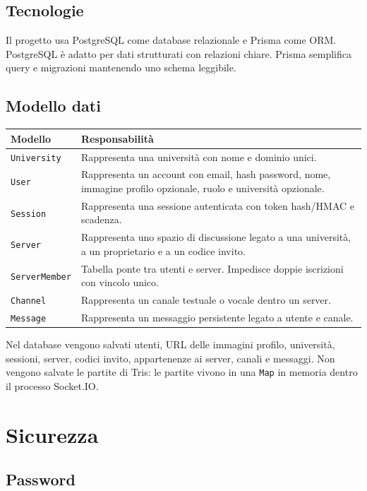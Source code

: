 \documentclass[11pt,a4paper]{article}
\begin{document}
\subsection{Tecnologie}

Il progetto usa PostgreSQL come database relazionale e Prisma come ORM. PostgreSQL è adatto per dati strutturati con relazioni chiare. Prisma semplifica query e migrazioni mantenendo uno schema leggibile.

\subsection{Modello dati}

\begin{longtable}{>{\raggedright\arraybackslash}p{}>{\raggedright\arraybackslash}p{}}
\hline
\textbf{Modello} & \textbf{Responsabilità} \\
\hline
\texttt{University} & Rappresenta una università con nome e dominio unici. \\
\texttt{User} & Rappresenta un account con email, hash password, nome, immagine profilo opzionale, ruolo e università opzionale. \\
\texttt{Session} & Rappresenta una sessione autenticata con token hash/HMAC e scadenza. \\
\texttt{Server} & Rappresenta uno spazio di discussione legato a una università, a un proprietario e a un codice invito. \\
\texttt{ServerMember} & Tabella ponte tra utenti e server. Impedisce doppie iscrizioni con vincolo unico. \\
\texttt{Channel} & Rappresenta un canale testuale o vocale dentro un server. \\
\texttt{Message} & Rappresenta un messaggio persistente legato a utente e canale. \\
\hline
\end{longtable}

Nel database vengono salvati utenti, URL delle immagini profilo, università, sessioni, server, codici invito, appartenenze ai server, canali e messaggi. Non vengono salvate le partite di Tris: le partite vivono in una \texttt{Map} in memoria dentro il processo Socket.IO.

\section{Sicurezza}

\subsection{Password}
\end{document}
